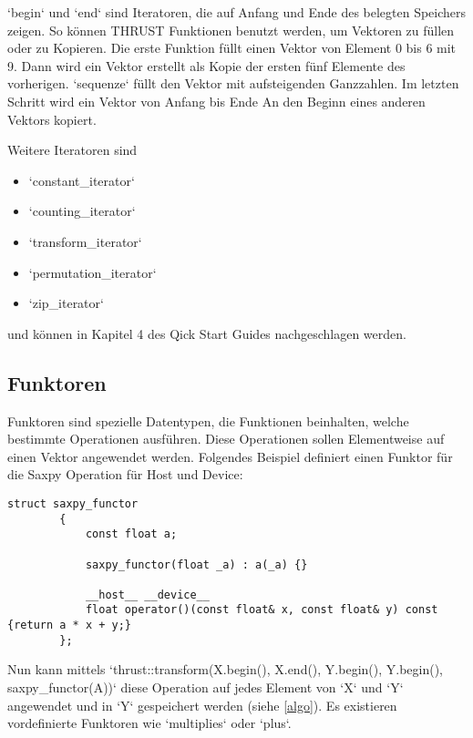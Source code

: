 		\li`begin` und \li`end` sind Iteratoren, die auf Anfang und Ende des belegten Speichers zeigen. So können THRUST Funktionen benutzt werden, um Vektoren zu füllen oder zu Kopieren. Die erste Funktion füllt einen Vektor von Element 0 bis 6	mit 9. Dann wird ein Vektor erstellt als Kopie der ersten fünf Elemente des vorherigen. \li`sequenze` füllt den Vektor mit aufsteigenden Ganzzahlen. Im letzten Schritt wird ein Vektor von Anfang bis Ende An den Beginn eines anderen Vektors kopiert.
		
		Weitere Iteratoren sind
		\begin{itemize}
		\item \li`constant_iterator`
		\item \li`counting_iterator`
		\item \li`transform_iterator`
		\item \li`permutation_iterator`
		\item \li`zip_iterator`
		\end{itemize}
		und können in Kapitel 4 des Qick Start Guides nachgeschlagen werden. \autocite{thrustQSG}
		
		\subsection{Funktoren}\label{funk}
		Funktoren sind spezielle Datentypen, die Funktionen beinhalten, welche bestimmte Operationen ausführen. Diese Operationen sollen Elementweise auf einen Vektor angewendet werden. Folgendes Beispiel definiert einen Funktor für die Saxpy Operation für Host und Device:
		\begin{lstlisting}[caption=THRUST Funktoren]
		struct saxpy_functor
		{
			const float a;

			saxpy_functor(float _a) : a(_a) {}

			__host__ __device__
			float operator()(const float& x, const float& y) const {return a * x + y;}
		};
		\end{lstlisting}
		
		Nun kann mittels \li`thrust::transform(X.begin(), X.end(), Y.begin(), Y.begin(), saxpy_functor(A))` diese Operation auf jedes Element von \li`X` und \li`Y` angewendet und in \li`Y` gespeichert werden (siehe \ref{algo}).	Es existieren vordefinierte Funktoren wie \li`multiplies` oder \li`plus`.
		
